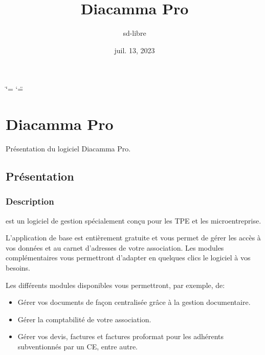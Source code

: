 \documentclass[a4paper,10pt,oneside,french]{sphinxmanual}
\title{Diacamma Pro}
\date{juil. 13, 2023}
\author{sd-libre}
\begin{document}
\ifdefined\shorthandoff
  \ifnum\catcode`\=\string=\active\shorthandoff{=}\fi
  \ifnum\catcode`\"=\active{}\fi
\fi

\pagestyle{empty}
\sphinxmaketitle
\pagestyle{plain}
\sphinxtableofcontents
\pagestyle{normal}
\label{\detokenize{index::doc}}


\sphinxstepscope


\chapter{Diacamma Pro}
\label{\detokenize{pro/index:diacamma-pro}}\label{\detokenize{pro/index::doc}}
\sphinxAtStartPar
Présentation du logiciel Diacamma Pro.

\sphinxstepscope


\section{Présentation}
\label{\detokenize{pro/presentation:presentation}}\label{\detokenize{pro/presentation::doc}}

\subsection{Description}
\label{\detokenize{pro/presentation:description}}
\sphinxAtStartPar
{} est un logiciel de gestion spécialement conçu pour les TPE et les micro\sphinxhyphen{}entreprise.

\sphinxAtStartPar
L’application de base est entièrement gratuite et vous permet de gérer les accès à vos données et au carnet d’adresses de votre association. Les modules complémentaires vous permettront d’adapter en quelques clics le logiciel à vos besoins.

\sphinxAtStartPar
Les différents modules disponibles vous permettront, par exemple, de:
\begin{itemize}
\item {} 
\sphinxAtStartPar
Gérer vos documents de façon centralisée grâce à la gestion documentaire.

\item {} 
\sphinxAtStartPar
Gérer la comptabilité de votre association.

\item {} 
\sphinxAtStartPar
Gérer vos devis, factures et factures proformat pour les adhérents subventionnés par un CE, entre autre.

\end{itemize}
\end{document}
